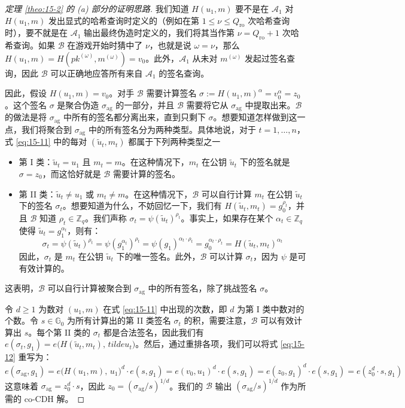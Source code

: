 \begin{proof}[定理 \ref{theo:15-2} 的 (a) 部分的证明思路]
我们知道 $H(u_1,m)$ 要不是在 $\mathcal{A}_1$ 对 $H(u_1,m)$ 发出显式的哈希查询时定义的（例如在第 $1\leq\nu\leq Q_\mathrm{ro}$ 次哈希查询时），要不就是在 $\mathcal{A}_1$ 输出最终伪造时定义的，我们将其当作第 $\nu=Q_\mathrm{ro}+1$ 次哈希查询。如果 $\mathcal{B}$ 在游戏开始时猜中了 $\nu$，也就是说 $\omega=\nu$，那么 $H(u_1,m)=H(pk^{(\omega)},m^{(\omega)})=v_0$。此外，$\mathcal{A}_1$ 从未对 $m^{(\omega)}$ 发起过签名查询，因此 $\mathcal{B}$ 可以正确地应答所有来自 $\mathcal{A}_1$ 的签名查询。

因此，假设 $H(u_1,m)=v_0$。对手 $\mathcal{B}$ 需要计算签名 $\sigma:=H(u_1,m)^\alpha=v_0^\alpha=z_0$。这个签名 $\sigma$ 是聚合伪造 $\sigma_\mathrm{ag}$ 的一部分，并且 $\mathcal{B}$ 需要将它从 $\sigma_\mathrm{ag}$ 中提取出来。$\mathcal{B}$ 的做法是将 $\sigma_\mathrm{ag}$ 中所有的签名都分离出来，直到只剩下 $\sigma$。想要知道怎样做到这一点，我们将聚合到 $\sigma_\mathrm{ag}$ 中的所有签名分为两种类型。具体地说，对于 $t=1,\dots,n$，式 \ref{eq:15-11} 中的每对 $(\tilde{u}_t,m_t)$ 都属于下列两种类型之一
\begin{itemize}
	\item 第 I 类：$\tilde{u}_t=u_1$ 且 $m_t=m$。在这种情况下，$m_t$ 在公钥 $\tilde{u}_t$ 下的签名就是 $\sigma=z_0$，而这恰好就是 $\mathcal{B}$ 需要计算的签名。
	\item 第 II 类：$\tilde{u}_t\neq u_1$ 或 $m_t\neq m$。在这种情况下，$\mathcal{B}$ 可以自行计算 $m_t$ 在公钥 $\tilde{u}_t$ 下的签名 $\sigma_t$。想要知道为什么，不妨回忆一下，我们有 $H(\tilde{u}_t,m_t)=g_0^{\rho_t}$，并且 $\mathcal{B}$ 知道 $\rho_t\in\mathbb{Z}_q$。我们声称 $\sigma_t=\psi(\tilde{u}_t)^{\rho_t}$。事实上，如果存在某个 $\alpha_t\in\mathbb{Z}_q$ 使得 $\tilde{u}_t=g_1^{\alpha_t}$，则有：
		\begin{equation}\label{eq:15-13}
			\sigma_t=\psi(\tilde{u}_t)^{\rho_t}
			=\psi(g_1^{\alpha_t})^{\rho_t}
			=\psi(g_1)^{\alpha_t \cdot \rho_t}
			=g_0^{\alpha_t \cdot \rho_t}
			=H(\tilde{u}_t,m_t)^{\alpha_t}
		\end{equation}
		因此，$\sigma_t$ 是 $m_t$ 在公钥 $\tilde{u}_t$ 下的唯一签名。此外，$\mathcal{B}$ 可以计算 $\sigma_t$，因为 $\psi$ 是可有效计算的。
\end{itemize}
这表明，$\mathcal{B}$ 可以自行计算被聚合到 $\sigma_\mathrm{ag}$ 中的所有签名，除了挑战签名 $\sigma$。

令 $d\geq 1$ 为数对 $(u_1,m)$ 在式 \ref{eq:15-11} 中出现的次数，即 $d$ 为第 I 类中数对的个数。令 $s\in\mathbb{G}_0$ 为所有计算出的第 II 类签名 $\sigma_t$ 的积，需要注意，$\mathcal{B}$ 可以有效计算出 $s$。每个第 II 类的 $\sigma_t$ 都是合法签名，因此我们有 $e(\sigma_t,g_1)=e\big(H(\tilde{u}_t,m_t),\,tilde{u}_t\big)$。然后，通过重排各项，我们可以将式 \ref{eq:15-12} 重写为：
\[
e(\sigma_\mathrm{ag},g_1)
=e\big(H(u_1,m),\,u_1\big)^d\cdot e(s,g_1)
=e(v_0,u_1)^d\cdot e(s,g_1)
=e(z_0,g_1)^d\cdot e(s,g_1)
=e(z_0^d\cdot s,g_1)
\]
这意味着 $\sigma_\mathrm{ag}=z_0^d\cdot s$，因此 $z_0=(\sigma_\mathrm{ag}/s)^{1/d}$。我们的 $\mathcal{B}$ 输出 $(\sigma_\mathrm{ag}/s)^{1/d}$ 作为所需的 co-CDH 解。


\end{proof}
